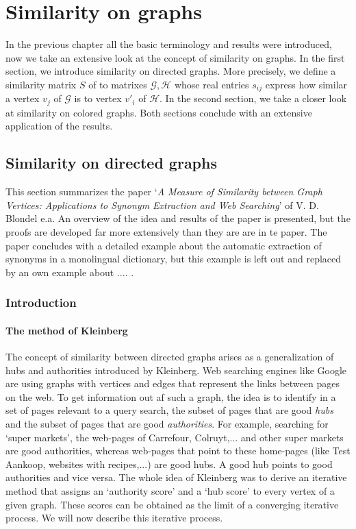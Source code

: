 \documentclass[a4paper,11pt]{report}
\newcommand{\graf}{\mathscr{G}}
\newcommand{\grafeen}{\mathscr{H}}
\begin{document}
\chapter{Similarity on graphs}

In the previous chapter all the basic terminology and results were introduced, 
now we take an extensive look at the concept of similarity on graphs. In the 
first section, we introduce similarity on directed graphs. More precisely, we 
define a similarity matrix $S$ of to matrixes $\graf, \grafeen$ whose real entries $s_{ij}$ express how similar a 
vertex $v_j$ of $\graf$ is to vertex $v'_i$ of $\grafeen$. In the second 
section, we take a closer look at similarity on colored graphs. Both sections 
conclude with an extensive application of the results.

\section{Similarity on directed graphs}
This section summarizes the paper `\emph{A Measure of Similarity between Graph Vertices: 
Applications to Synonym Extraction and Web Searching}'\cite{blondel} of V. D. Blondel e.a. 
An overview of the idea and results of the paper is presented, but the 
proofs are developed far more extensively than they are are in te paper. The 
paper concludes with a detailed example about the automatic extraction of 
synonyms in a monolingual dictionary, but this example is left out and replaced 
by an own example about .... .

\subsection{Introduction}
\subsubsection{The method of Kleinberg}
The concept of similarity between directed graphs arises as a generalization of 
hubs and authorities introduced by Kleinberg\cite{kleinberg}. Web searching engines like Google are using graphs with 
vertices and edges that represent the links between pages on the web. To get 
information out af such a graph, the idea is to identify in a set of pages 
relevant to a query search, the subset of pages that are good \emph{hubs} and the 
subset of pages that are good \emph{authorities}. For example, searching for 
`super markets', the web-pages of Carrefour, Colruyt,... and other super markets 
are good authorities, whereas web-pages that point to these home-pages (like Test Aankoop, websites with 
recipes,...) are good hubs. A good hub points to good authorities and vice versa. 
The whole idea of Kleinberg was to derive an iterative method that assigns an
`authority score' and a `hub score' to every vertex of a given graph. These 
scores can be obtained as the limit of a converging iterative process. We will 
now describe this iterative process.\\
\end{document}
